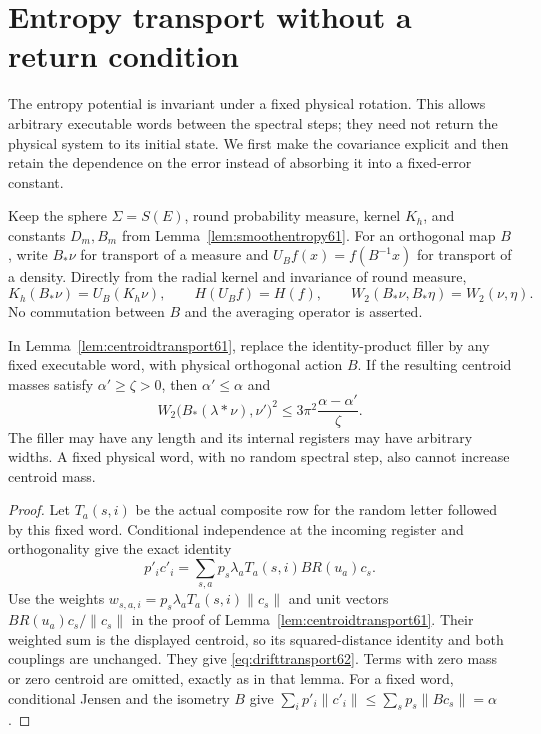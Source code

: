 \section{Entropy transport without a return condition}\label{sec:drift62}
The entropy potential is invariant under a fixed physical rotation. This
allows arbitrary executable words between the spectral steps; they need
not return the physical system to its initial state. We first make the
covariance explicit and then retain the dependence on the error instead
of absorbing it into a fixed-error constant.

Keep the sphere $\Sigma=S(E)$, round probability measure, kernel $K_h$,
and constants $D_m,B_m$ from Lemma~\ref{lem:smoothentropy61}. For an
orthogonal map $B$, write $B_*\nu$ for transport of a measure and
$U_Bf(x)=f(B^{-1}x)$ for transport of a density. Directly from the
radial kernel and invariance of round measure,
\begin{equation}\label{eq:covariance62}
 K_h(B_*\nu)=U_B(K_h\nu),\qquad
 H(U_Bf)=H(f),\qquad
 W_2(B_*\nu,B_*\eta)=W_2(\nu,\eta).
\end{equation}
No commutation between $B$ and the averaging operator is asserted.

\begin{lemma}
\label{lem:drifttransport62}
In Lemma~\ref{lem:centroidtransport61}, replace the identity-product
filler by any fixed executable word, with physical orthogonal action
$B$. If the resulting centroid masses satisfy $\alpha'\ge\zeta>0$,
then $\alpha'\le\alpha$ and
\begin{equation}\label{eq:drifttransport62}
 W_2\bigl(B_*(\lambda*\nu),\nu'\bigr)^2
             \le 3\pi^2\frac{\alpha-\alpha'}{\zeta}.
\end{equation}
The filler may have any length and its internal registers may have
arbitrary widths. A fixed physical word, with no random spectral step,
also cannot increase centroid mass.
\end{lemma}
\begin{proof}
Let $T_a(s,i)$ be the actual composite row for the random letter followed
by this fixed word. Conditional independence at the incoming register
and orthogonality give the exact identity
\[
 p'_i c'_i=\sum_{s,a}p_s\lambda_a T_a(s,i)BR(u_a)c_s.
\]
Use the weights $w_{s,a,i}=p_s\lambda_a T_a(s,i)\|c_s\|$ and unit
vectors $BR(u_a)c_s/\|c_s\|$ in the proof of
Lemma~\ref{lem:centroidtransport61}. Their weighted sum is the displayed
centroid, so its squared-distance identity and both couplings are
unchanged. They give \eqref{eq:drifttransport62}. Terms with zero mass
or zero centroid are omitted, exactly as in that lemma. For a fixed
word, conditional Jensen and the isometry $B$ give
$\sum_i p'_i\|c'_i\|\le\sum_s p_s\|Bc_s\|=\alpha$.
\end{proof}

